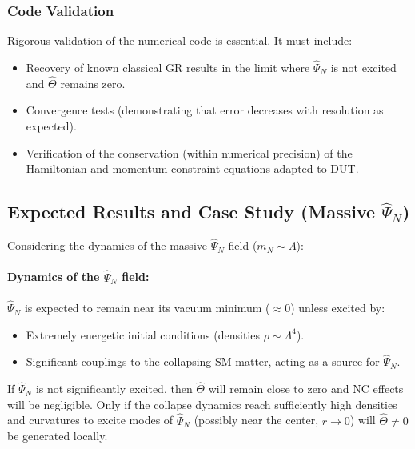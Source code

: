 \documentclass[11pt, a4paper]{article}
\theoremstyle{remark}
\newcommand{\Op}[1]{\hat{#1}}
\begin{document}
\subsubsection{Code Validation}
\label{ssubsec:code_validation_collapse}
Rigorous validation of the numerical code is essential. It must include:
\begin{itemize}
    \item Recovery of known classical GR results in the limit where \( \Op{\Psi}_N \) is not excited and \( \Op{\Theta} \) remains zero.
    \item Convergence tests (demonstrating that error decreases with resolution as expected).
    \item Verification of the conservation (within numerical precision) of the Hamiltonian and momentum constraint equations adapted to DUT.
\end{itemize}

\subsection{Expected Results and Case Study (Massive \texorpdfstring{\( \Op{\Psi}_N \)}{PsiN})}
\label{subsec:results_psi_n_case}

Considering the dynamics of the massive \( \Op{\Psi}_N \) field (\( m_N \sim \Lambda \)):

\paragraph{Dynamics of the \( \Op{\Psi}_N \) field:}
\( \Op{\Psi}_N \) is expected to remain near its vacuum minimum (\( \approx 0 \)) unless excited by:
\begin{itemize}
    \item Extremely energetic initial conditions (densities \( \rho \sim \Lambda^4 \)).
    \item Significant couplings to the collapsing SM matter, acting as a source for \( \Op{\Psi}_N \).
\end{itemize}
If \( \Op{\Psi}_N \) is not significantly excited, then \( \Op{\Theta} \) will remain close to zero and NC effects will be negligible. Only if the collapse dynamics reach sufficiently high densities and curvatures to excite modes of \( \Op{\Psi}_N \) (possibly near the center, \( r \to 0 \)) will \( \Op{\Theta} \neq 0 \) be generated locally.
\end{document}
